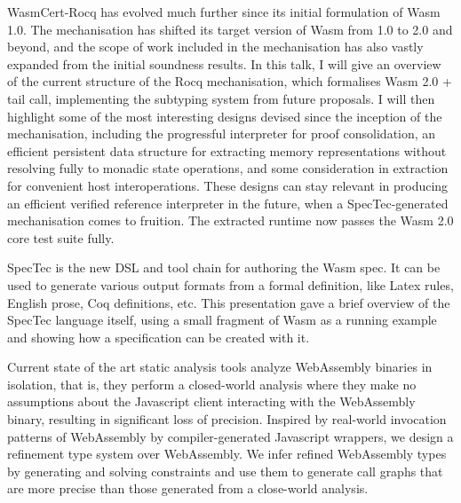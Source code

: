 \documentclass[a4paper,UKenglish]{dagrep-v2018}
\begin{document}
WasmCert-Rocq has evolved much further since its initial formulation of Wasm 1.0. The mechanisation has shifted its target version of Wasm from 1.0 to 2.0 and beyond, and the scope of work included in the mechanisation has also vastly expanded from the initial soundness results. In this talk, I will give an overview of the current structure of the Rocq mechanisation, which formalises Wasm 2.0 + tail call, implementing the subtyping system from future proposals. I will then highlight some of the most interesting designs devised since the inception of the mechanisation, including the progressful interpreter for proof consolidation, an efficient persistent data structure for extracting memory representations without resolving fully to monadic state operations, and some consideration in extraction for convenient host interoperations. These designs can stay relevant in producing an efficient verified reference interpreter in the future, when a SpecTec-generated mechanisation comes to fruition. The extracted runtime now passes the Wasm 2.0 core test suite fully.

\license
{}

SpecTec is the new DSL and tool chain for authoring the Wasm spec. It can be used to generate various output formats from a formal definition, like Latex rules, English prose, Coq definitions, etc. This presentation gave a brief overview of the SpecTec language itself, using a small fragment of Wasm as a running example and showing how a specification can be created with it.

\license
{}

Current state of the art static analysis tools analyze WebAssembly binaries in isolation, that is, they perform a closed-world analysis where they make no assumptions about the Javascript client interacting with the WebAssembly binary, resulting in significant loss of precision. Inspired by real-world invocation patterns of WebAssembly by compiler-generated Javascript wrappers, we design a refinement type system over WebAssembly. We infer refined WebAssembly types by generating and solving constraints and use them to generate call graphs that are more precise than those generated from a close-world analysis.
\end{document}
